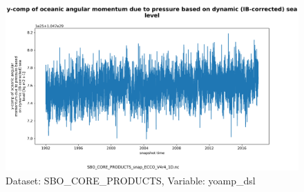 \begin{figure}[H]
\centering
\includegraphics[scale=0.55]{../images/plots/v4r4/oneD_plots/SBO_Core_Products/yoamp_dsl.png}
\caption{Dataset: SBO\_CORE\_PRODUCTS, Variable: yoamp\_dsl}
\label{tab:table-SBO_CORE_PRODUCTS_yoamp_dsl-Plot}
\end{figure}
\newpage
\pagebreak
